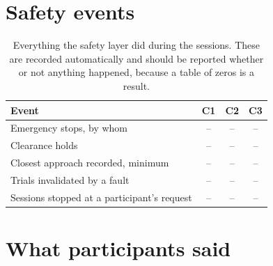 \section{Safety events}

\begin{table}[htbp]
  \centering
  \small
  \caption[Safety during sessions]{Everything the safety layer did during the
  sessions. These are recorded automatically and should be reported whether or
  not anything happened, because a table of zeros is a result.}
  \label{tab:safety-events}
  \begin{tabular}{@{}lccc@{}}
    \toprule
    \textbf{Event} & \textbf{C1} & \textbf{C2} & \textbf{C3} \\
    \midrule
    Emergency stops, by whom & -- & -- & -- \\
    Clearance holds & -- & -- & -- \\
    Closest approach recorded, minimum & -- & -- & -- \\
    Trials invalidated by a fault & -- & -- & -- \\
    Sessions stopped at a participant's request & -- & -- & -- \\
    \bottomrule
  \end{tabular}
\end{table}

\section{What participants said}

\noindent{}
